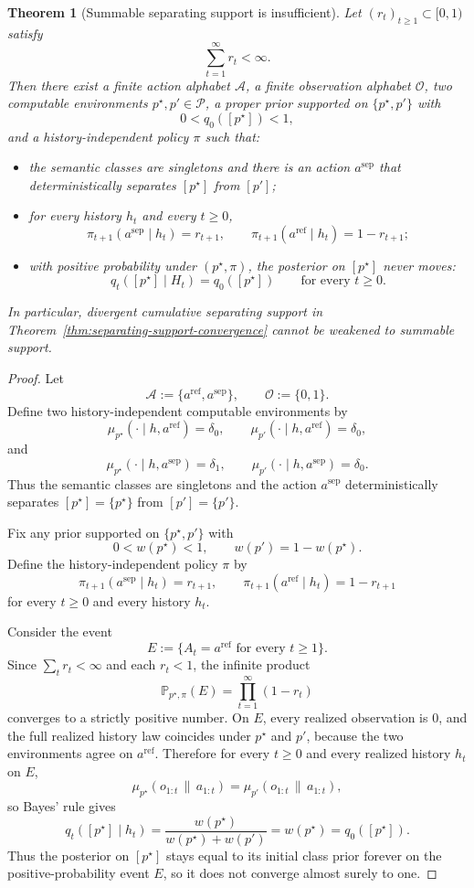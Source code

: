 \documentclass[11pt]{article}
\newtheorem{theorem}{Theorem}[section]
\theoremstyle{definition}
\theoremstyle{remark}
\newcommand{\Acal}{\mathcal{A}}
\newcommand{\Ocal}{\mathcal{O}}
\newcommand{\Pcal}{\mathcal{P}}
\newcommand{\Prob}{\mathbb{P}}
\newcommand{\givena}{\,\|\,}
\begin{document}
\begin{theorem}[Summable separating support is insufficient]
\label{thm:summable-support-insufficient}
Let $(r_t)_{t\ge 1}\subset[0,1)$ satisfy
\[
\sum_{t=1}^{\infty}r_t<\infty.
\]
Then there exist a finite action alphabet $\Acal$, a finite observation alphabet $\Ocal$, two computable environments $p^\star,p'\in\Pcal$, a proper prior supported on $\{p^\star,p'\}$ with
\[
0<q_0([p^\star])<1,
\]
and a history-independent policy $\pi$ such that:
\begin{itemize}
\item[(i)] the semantic classes are singletons and there is an action $a^{\mathrm{sep}}$ that deterministically separates $[p^\star]$ from $[p']$;
\item[(ii)] for every history $h_t$ and every $t\ge 0$,
\[
\pi_{t+1}(a^{\mathrm{sep}}\mid h_t)=r_{t+1},
\qquad
\pi_{t+1}(a^{\mathrm{ref}}\mid h_t)=1-r_{t+1};
\]
\item[(iii)] with positive probability under $(p^\star,\pi)$, the posterior on $[p^\star]$ never moves:
\[
q_t([p^\star]\mid H_t)=q_0([p^\star])
\qquad\text{for every }t\ge 0.
\]
\end{itemize}
In particular, divergent cumulative separating support in Theorem~\ref{thm:separating-support-convergence} cannot be weakened to summable support.
\end{theorem}

\begin{proof}
Let
\[
\Acal:=\{a^{\mathrm{ref}},a^{\mathrm{sep}}\},
\qquad
\Ocal:=\{0,1\}.
\]
Define two history-independent computable environments by
\[
\mu_{p^\star}(\cdot\mid h,a^{\mathrm{ref}})=\delta_0,
\qquad
\mu_{p'}(\cdot\mid h,a^{\mathrm{ref}})=\delta_0,
\]
and
\[
\mu_{p^\star}(\cdot\mid h,a^{\mathrm{sep}})=\delta_1,
\qquad
\mu_{p'}(\cdot\mid h,a^{\mathrm{sep}})=\delta_0.
\]
Thus the semantic classes are singletons and the action $a^{\mathrm{sep}}$ deterministically separates $[p^\star]=\{p^\star\}$ from $[p']=\{p'\}$.

Fix any prior supported on $\{p^\star,p'\}$ with
\[
0<w(p^\star)<1,
\qquad
w(p')=1-w(p^\star).
\]
Define the history-independent policy $\pi$ by
\[
\pi_{t+1}(a^{\mathrm{sep}}\mid h_t)=r_{t+1},
\qquad
\pi_{t+1}(a^{\mathrm{ref}}\mid h_t)=1-r_{t+1}
\]
for every $t\ge 0$ and every history $h_t$.

Consider the event
\[
E:=\{A_t=a^{\mathrm{ref}}\text{ for every }t\ge 1\}.
\]
Since $\sum_t r_t<\infty$ and each $r_t<1$, the infinite product
\[
\Prob_{p^\star,\pi}(E)=\prod_{t=1}^{\infty}(1-r_t)
\]
converges to a strictly positive number. On $E$, every realized observation is $0$, and the full realized history law coincides under $p^\star$ and $p'$, because the two environments agree on $a^{\mathrm{ref}}$. Therefore for every $t\ge 0$ and every realized history $h_t$ on $E$,
\[
\mu_{p^\star}(o_{1:t}\givena a_{1:t})=\mu_{p'}(o_{1:t}\givena a_{1:t}),
\]
so Bayes' rule gives
\[
q_t([p^\star]\mid h_t)
=
\frac{w(p^\star)}{w(p^\star)+w(p')}
=
w(p^\star)
=
q_0([p^\star]).
\]
Thus the posterior on $[p^\star]$ stays equal to its initial class prior forever on the positive-probability event $E$, so it does not converge almost surely to one.
\end{proof}
\end{document}
